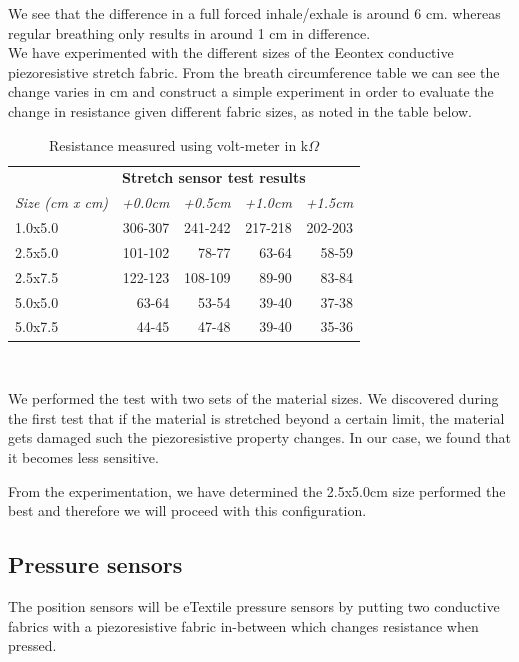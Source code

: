 \documentclass{sigchi-ext}
\begin{document}
We see that the difference in a full forced inhale/exhale is around 6 cm. whereas regular
breathing only results in around 1 cm in difference.\\
We have experimented with the different sizes of the Eeontex conductive piezoresistive
stretch fabric. From the breath circumference table we can see the change varies in cm and construct a simple experiment in order to evaluate the change in resistance given
different fabric sizes, as noted in the table below.
\begin{table}[H]
  \centering
  \begin{tabular}{l r r r r}
    & \multicolumn{4}{l}{\small{\textbf{Stretch sensor test results}}} \\
    \cmidrule(r){2-4}
    {\small\textit{Size (cm x cm)}}
    & {\small \textit{+0.0cm}}
    & {\small \textit{+0.5cm}}
    & {\small \textit{+1.0cm}}
    & {\small \textit{+1.5cm}} \\
    \midrule
    1.0x5.0    & 306-307 & 241-242 & 217-218 & 202-203\\
    2.5x5.0    & 101-102 & 78-77 & 63-64 & 58-59 \\
    2.5x7.5    & 122-123 & 108-109 & 89-90 & 83-84 \\
    5.0x5.0    & 63-64 & 53-54 & 39-40 & 37-38 \\
    5.0x7.5    & 44-45 & 47-48 & 39-40 & 35-36 \\
  \end{tabular}
  \caption{Resistance measured using volt-meter in k$\Omega$}~\label{tab:stretch-test}
\end{table}
We performed the test with two sets of the material sizes.
We discovered during the first test that if the material
is stretched beyond a certain limit, the material gets
damaged such the piezoresistive property changes. In our case,
we found that it becomes less sensitive.

From the experimentation, we have determined the 2.5x5.0cm size
performed the best and therefore we will proceed with this
configuration.

\clearpage

\subsection{Pressure sensors}
The position sensors will be eTextile pressure sensors by putting two conductive
fabrics with a piezoresistive fabric in-between which changes resistance when
pressed.
\end{document}
